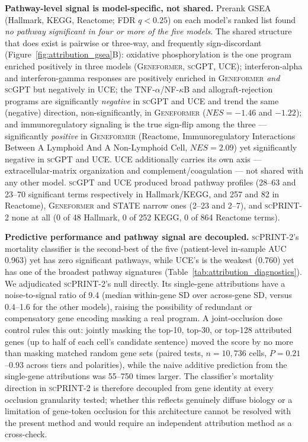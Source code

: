 \documentclass[11pt,a4paper]{article}
\newcommand{\model}[1]{\textsc{#1}}
\begin{document}
\textbf{Pathway-level signal is model-specific, not shared.} Prerank GSEA
(Hallmark, KEGG, Reactome; FDR $q < 0.25$) on each model's ranked list found
\emph{no pathway significant in four or more of the five models}. The shared
structure that does exist is pairwise or three-way, and frequently
sign-discordant (Figure~\ref{fig:attribution_gsea}B): oxidative
phosphorylation is the one program enriched positively in three models
(\model{Geneformer}, \model{scGPT}, \model{UCE}); interferon-alpha and
interferon-gamma responses are positively enriched in \model{Geneformer}
\emph{and} \model{scGPT} but negatively in \model{UCE}; the
TNF-$\alpha$/NF-$\kappa$B and allograft-rejection programs are
significantly \emph{negative} in \model{scGPT} and \model{UCE} and trend
the same (negative) direction, non-significantly, in \model{Geneformer}
($NES=-1.46$ and $-1.22$); and immunoregulatory signaling is the true
sign-flip among the three --- significantly \emph{positive} in
\model{Geneformer} (Reactome, Immunoregulatory Interactions Between A
Lymphoid And A Non-Lymphoid Cell, $NES=2.09$) yet significantly negative in
\model{scGPT} and \model{UCE}. \model{UCE} additionally
carries its own axis --- extracellular-matrix organization and
complement/coagulation --- not shared with any other model. \model{scGPT}
and \model{UCE} produced broad pathway profiles (28--63 and 23--70
significant terms respectively in Hallmark/KEGG, and 257 and 82 in
Reactome), \model{Geneformer} and \model{STATE} narrow ones (2--23 and
2--7), and \model{scPRINT-2} none at all (0 of 48 Hallmark, 0 of 252 KEGG,
0 of 864 Reactome terms).

\textbf{Predictive performance and pathway signal are decoupled.}
\model{scPRINT-2}'s mortality classifier is the second-best of the five
(patient-level in-sample AUC 0.963) yet has zero significant pathways, while
\model{UCE}'s is the weakest (0.760) yet has one of the broadest pathway
signatures (Table~\ref{tab:attribution_diagnostics}). We adjudicated
\model{scPRINT-2}'s null directly. Its single-gene attributions have a
noise-to-signal ratio of 9.4 (median within-gene SD over across-gene SD,
versus 0.4--1.6 for the other models), raising the possibility of redundant
or compensatory gene encoding masking a real program. A joint-occlusion
dose control rules this out: jointly masking the top-10, top-30, or top-128
attributed genes (up to half of each cell's candidate sentence) moved the
score by no more than masking matched random gene sets (paired tests,
$n = 10{,}736$ cells, $P = 0.21$--$0.93$ across tiers and polarities), while
the naive additive prediction from the single-gene attributions was 55--750
times larger. The classifier's mortality direction in \model{scPRINT-2} is
therefore decoupled from gene identity at every occlusion granularity
tested; whether this reflects genuinely diffuse biology or a limitation of
gene-token occlusion for this architecture cannot be resolved with the
present method and would require an independent attribution method as a
cross-check.
\end{document}
